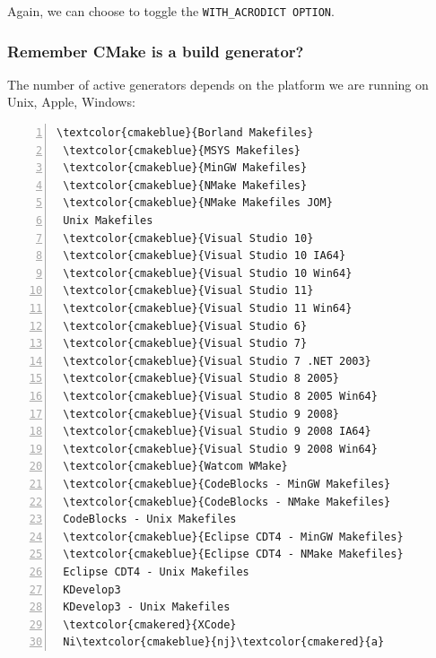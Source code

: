 \documentclass[compress,slidestop,table,usepdftitle=false
              ]
               {beamer}
\begin{document}
\begin{frame}
\begin{center}
Again, we can choose to toggle the \lstinline!WITH_ACRODICT OPTION!.
\end{center}
\end{frame}

\begin{frame}[fragile]
\frametitle{Remember CMake is a build \alert{generator}?}
The number of active generators depends on the platform
we are running on {Unix}, \textcolor{cmakered}{Apple},
\textcolor{cmakeblue}{Windows}:
\begin{multicols}{2}
\begin{Verbatim}[commandchars=\\\{\},fontsize=\scriptsize,numbers=left]
 \textcolor{cmakeblue}{Borland Makefiles}
 \textcolor{cmakeblue}{MSYS Makefiles}
 \textcolor{cmakeblue}{MinGW Makefiles}
 \textcolor{cmakeblue}{NMake Makefiles}
 \textcolor{cmakeblue}{NMake Makefiles JOM}
 Unix Makefiles
 \textcolor{cmakeblue}{Visual Studio 10}
 \textcolor{cmakeblue}{Visual Studio 10 IA64}
 \textcolor{cmakeblue}{Visual Studio 10 Win64}
 \textcolor{cmakeblue}{Visual Studio 11}
 \textcolor{cmakeblue}{Visual Studio 11 Win64}
 \textcolor{cmakeblue}{Visual Studio 6}
 \textcolor{cmakeblue}{Visual Studio 7}
 \textcolor{cmakeblue}{Visual Studio 7 .NET 2003}
 \textcolor{cmakeblue}{Visual Studio 8 2005}
 \textcolor{cmakeblue}{Visual Studio 8 2005 Win64}
 \textcolor{cmakeblue}{Visual Studio 9 2008}
 \textcolor{cmakeblue}{Visual Studio 9 2008 IA64}
 \textcolor{cmakeblue}{Visual Studio 9 2008 Win64}
 \textcolor{cmakeblue}{Watcom WMake}
 \textcolor{cmakeblue}{CodeBlocks - MinGW Makefiles}
 \textcolor{cmakeblue}{CodeBlocks - NMake Makefiles}
 CodeBlocks - Unix Makefiles
 \textcolor{cmakeblue}{Eclipse CDT4 - MinGW Makefiles}
 \textcolor{cmakeblue}{Eclipse CDT4 - NMake Makefiles}
 Eclipse CDT4 - Unix Makefiles
 KDevelop3
 KDevelop3 - Unix Makefiles
 \textcolor{cmakered}{XCode}
 Ni\textcolor{cmakeblue}{nj}\textcolor{cmakered}{a}
\end{Verbatim}

\end{multicols}
\end{frame}
\end{document}
